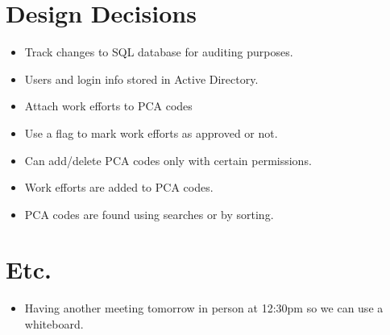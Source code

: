 \documentclass{article}
\begin{document}
\section{Design Decisions}
\begin{itemize}
\item Track changes to SQL database for auditing purposes.
\item Users and login info stored in Active Directory.
\item Attach work efforts to PCA codes
\item Use a flag to mark work efforts as approved or not.
\item Can add/delete PCA codes only with certain permissions.
\item Work efforts are added to PCA codes.
\item PCA codes are found using searches or by sorting.
\end{itemize}

\section{Etc.}
\begin{itemize}
\item Having another meeting tomorrow in person at 12:30pm so we can use a whiteboard.
\end{itemize}
\end{document}
